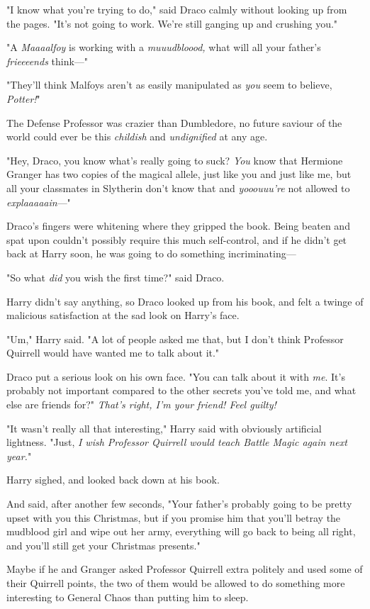 "I know what you're trying to do," said Draco calmly without looking up from 
the pages. "It's not going to work. We're still ganging up and crushing you."

"A \emph{Maaaalfoy} is working with a \emph{muuudbloood,} what will all your 
father's \emph{frieeeends} think---"

"They'll think Malfoys aren't as easily manipulated as \emph{you} seem to 
believe, \emph{Potter!}"

The Defense Professor was crazier than Dumbledore, no future saviour of the 
world could ever be this \emph{childish} and \emph{undignified} at any age.

"Hey, Draco, you know what's really going to suck? \emph{You} know that 
Hermione Granger has two copies of the magical allele, just like you and just 
like me, but all your classmates in Slytherin don't know that and 
\emph{yooouuu're} not allowed to \emph{explaaaaain}---"

Draco's fingers were whitening where they gripped the book. Being beaten and 
spat upon couldn't possibly require this much self-control, and if he didn't 
get back at Harry soon, he was going to do something incriminating---

"So what \emph{did} you wish the first time?" said Draco.

Harry didn't say anything, so Draco looked up from his book, and felt a twinge 
of malicious satisfaction at the sad look on Harry's face.

"Um," Harry said. "A lot of people asked me that, but I don't think Professor 
Quirrell would have wanted me to talk about it."

Draco put a serious look on his own face. "You can talk about it with 
\emph{me}. It's probably not important compared to the other secrets you've 
told me, and what else are friends for?" \emph{That's right, I'm your friend! 
Feel guilty!}

"It wasn't really all that interesting," Harry said with obviously artificial 
lightness. "Just, \emph{I wish Professor Quirrell would teach Battle Magic 
again next year.}"

Harry sighed, and looked back down at his book.

And said, after another few seconds, "Your father's probably going to be pretty 
upset with you this Christmas, but if you promise him that you'll betray the 
mudblood girl and wipe out her army, everything will go back to being all 
right, and you'll still get your Christmas presents."

Maybe if he and Granger asked Professor Quirrell extra politely and used some 
of their Quirrell points, the two of them would be allowed to do something more 
interesting to General Chaos than putting him to sleep.
